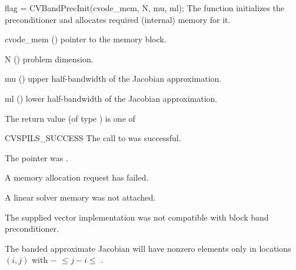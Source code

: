 {
  flag = CVBandPrecInit(cvode\_mem, N, mu, ml);
}
{
  The function  initializes the {\cvbandpre} preconditioner
  and allocates required (internal) memory for it.
}
{
  \begin{args}
  \item[cvode\_mem] ()
    pointer to the {\cvode} memory block.
  \item[N] ()
    problem dimension.
  \item[mu] ()
    upper half-bandwidth of the Jacobian approximation.
  \item[ml] ()
    lower half-bandwidth of the Jacobian approximation.
  \end{args}
}
{
  The return value  (of type ) is one of
  \begin{args}
  \item[CVSPILS\_SUCCESS]
    The call to  was successful.
  \item[\id{CVSPILS\_MEM\_NULL}]
    The  pointer was .
  \item[\Id{CVSPILS\_MEM\_FAIL}]
    A memory allocation request has failed.
  \item[\Id{CVSPILS\_LMEM\_NULL}]
    A {\cvspils} linear solver memory was not attached.
  \item[\Id{CVSPILS\_ILL\_INPUT}]
    The supplied vector implementation was not compatible with block
    band preconditioner.
  \end{args}
}
{
  The banded approximate Jacobian will have nonzero elements only in locations
  $(i,j)$ with $-$ $\leq j-i \leq$ .
}

